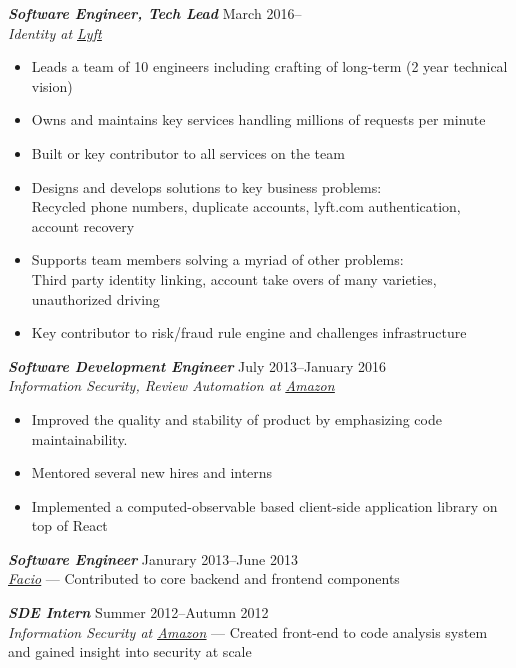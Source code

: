 \documentclass[line,letterpaper]{resume}
\begin{document}
\begin{resume}
    {\sl\textbf{Software Engineer, Tech Lead}} \hfill March 2016--\\
    \emph{Identity at \underline{\href{https://www.lyft.com/}{Lyft}}}
    \begin{itemize}
        \item Leads a team of 10 engineers including crafting of long-term (2 year technical vision)
        \item Owns and maintains key services handling millions of requests per minute
        \item Built or key contributor to all services on the team
        \item Designs and develops solutions to key business problems: \\
            Recycled phone numbers, duplicate accounts, lyft.com authentication, account recovery
        \item Supports team members solving a myriad of other problems: \\
            Third party identity linking, account take overs of many varieties, unauthorized driving
        \item Key contributor to risk/fraud rule engine and challenges infrastructure
    \end{itemize}
    \vspace{-6pt}

    {\sl\textbf{Software Development Engineer}} \hfill July 2013--January
    2016\\
    \emph{Information Security, Review Automation at
    \underline{\href{http://www.amazon.com/}{Amazon}}}
    \begin{itemize}
        \item Improved the quality and stability of product by emphasizing code
            maintainability.
        \item Mentored several new hires and interns
        \item Implemented a computed-observable based client-side application
            library on top of React
    \end{itemize}
    \vspace{-6pt}

    {\sl\textbf{Software Engineer}} \hfill Janurary 2013--June 2013\\
    \emph{\underline{\href{http://www.facio.com/}{Facio}}} --- Contributed to core backend and frontend components
    \vspace{-6pt}

    {\sl\textbf{SDE Intern}} \hfill Summer 2012--Autumn 2012\\
    \emph{Information Security at
    \underline{\href{http://www.amazon.com/}{Amazon}}} --- Created front-end to code analysis system and gained insight into security at scale
    \vspace{-6pt}


\end{resume}
\end{document}
